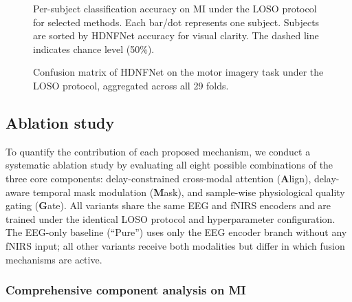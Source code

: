 \documentclass[preprint,12pt,authoryear]{elsarticle}
\begin{document}
\begin{figure}[t]
\centering
\caption{Per-subject classification accuracy on MI under the LOSO protocol for selected methods. Each bar/dot represents one subject. Subjects are sorted by HDNFNet accuracy for visual clarity. The dashed line indicates chance level (50\%).}
\label{fig:subject_acc}
\end{figure}

\begin{figure}[t]
\centering
\caption{Confusion matrix of HDNFNet on the motor imagery task under the LOSO protocol, aggregated across all 29 folds.}
\label{fig:confusion}
\end{figure}


\subsection{Ablation study}
\label{sec:ablation}

To quantify the contribution of each proposed mechanism, we conduct a systematic ablation study by evaluating all eight possible combinations of the three core components: delay-constrained cross-modal attention (\textbf{A}lign), delay-aware temporal mask modulation (\textbf{M}ask), and sample-wise physiological quality gating (\textbf{G}ate). All variants share the same EEG and fNIRS encoders and are trained under the identical LOSO protocol and hyperparameter configuration. The EEG-only baseline (``Pure'') uses only the EEG encoder branch without any fNIRS input; all other variants receive both modalities but differ in which fusion mechanisms are active.

\subsubsection{Comprehensive component analysis on MI}
\label{sec:ablation_comprehensive}
\end{document}
